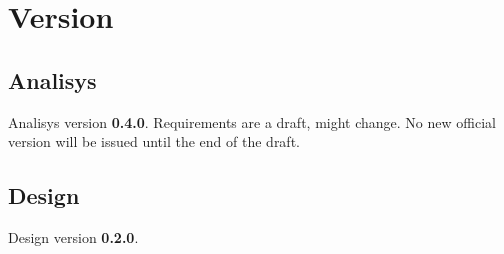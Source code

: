 

\section{Version}

\subsection{Analisys}
Analisys version \textbf{0.4.0}. Requirements are a draft, might change. No new official version will be issued until the end of the draft. 

\subsection{Design}
Design version \textbf{0.2.0}.

